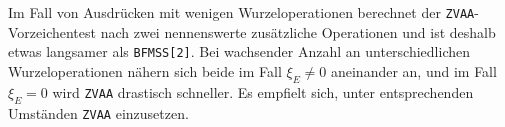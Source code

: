 \begin{remark}
Im Fall von Ausdrücken
mit wenigen Wurzeloperationen 
berechnet der {\tt ZVAA}-Vorzeichentest
nach 
zwei nennenswerte zusätzliche Operationen
und ist deshalb etwas langsamer als {\tt BFMSS[2]}.
Bei wachsender Anzahl an unterschiedlichen Wurzeloperationen 
nähern sich beide im Fall $\xi_E\ne 0$ aneinander an,
und im Fall $\xi_E=0$ wird {\tt ZVAA} drastisch schneller.
Es empfielt sich, unter entsprechenden Umständen {\tt ZVAA} einzusetzen.
\end{remark}
